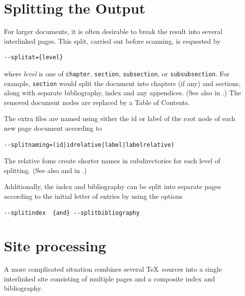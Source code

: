 \documentclass{book}
\begin{document}
\section[Splitting]{Splitting the Output}\label{usage.multiple}
For larger documents, it is often desirable to break the 
result into several interlinked pages. This split,
carried out before scanning, is requested by 
\begin{lstlisting}[style=shell]
--splitat={level}
\end{lstlisting}
where \textit{level} is one of \texttt{chapter},
\texttt{section}, \texttt{subsection}, or \texttt{subsubsection}.
For example, \texttt{section} would split the document into
chapters (if any) and sections, along with separate
bibliography, index and any appendices.
(See also  in .)
The removed document nodes are replaced by a Table of Contents.

The extra files are named using either the id or label
of the root node of each new page document according to
\begin{lstlisting}[style=shell]
--splitnaming=(id|idrelative|label|labelrelative)
\end{lstlisting}
The relative foms create shorter names in subdirectories for each
level of splitting.
(See also  and   in .)

Additionally, the index and bibliography can be split
into separate pages according to the initial letter of entries by using the options
\begin{lstlisting}[style=shell]
--splitindex  {and} --splitbibliography
\end{lstlisting}

\section[Sites]{Site processing}\label{usage.site}
A more complicated situation combines several \TeX\ sources
into a single interlinked site consisting of multiple pages
and a composite index and bibliography.
\end{document}
